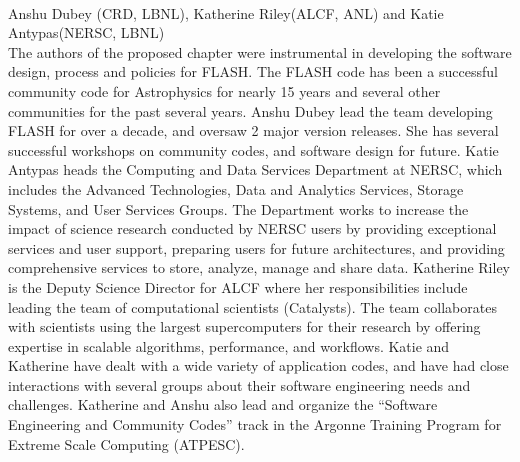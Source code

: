\documentclass[11pt]{article}
\begin{document}
{}\\ 

 Anshu Dubey (CRD, LBNL), Katherine
Riley(ALCF, ANL) and Katie Antypas(NERSC, LBNL) \\
The authors of the proposed chapter were instrumental in developing
the software design, process and policies for FLASH. The FLASH code
has been a successful community code for Astrophysics for nearly 15
years and  several other communities for the past several years. 
Anshu Dubey lead the team developing FLASH for over a decade, and
oversaw 2 major version releases. She has several successful
workshops on community codes, and software design for future.
Katie Antypas heads the Computing and Data Services Department at
NERSC, which includes the Advanced Technologies, Data and Analytics
Services, Storage Systems, and User Services Groups. The Department
works to increase the impact of science research conducted by NERSC
users by providing exceptional services and user support, preparing
users for future architectures, and providing comprehensive services to
store, analyze, manage and share data. Katherine Riley is the Deputy Science
Director for ALCF where her responsibilities include leading the team
of computational scientists (Catalysts). The team collaborates with
scientists using the largest supercomputers for their research by
offering expertise in scalable algorithms, performance, and workflows.
Katie and Katherine have dealt  with a wide variety of application
codes, and have had close interactions with several groups about their
software engineering needs and challenges. Katherine and Anshu
also lead and organize the ``Software Engineering and Community
Codes'' track in the Argonne Training Program for Extreme Scale
Computing (ATPESC). \\ 
\end{document}
